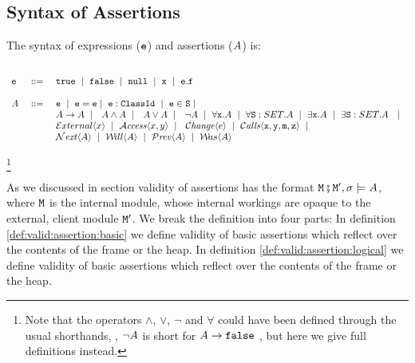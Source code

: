 \subsection{Syntax of Assertions}

\begin{definition}[Assertions] The syntax of   expressions (${\mbox{\tt{e}}}$) and assertions ($A$) is:
\label{def:assertions}

 $\begin{array}{lcl}
  ~  \\
  \SE & ::= &  \prg{true}  \ \mid\ \prg{false}  \    \mid\ \prg{null}  \ \mid \ \x  \ \mid \ \SE.\f  \\  
 ~ \\
\A &\ ::=\  &   \SE \   \mid \  \SE=\SE  \mid \   \SE:\prg{ClassId}  \ \mid \
    \SE\in\prg{S}   \mid  \  \\
    & &  \A \rightarrow \A  \ \mid\  \     \A \wedge \A  \ \mid\  \ \A \vee \A  \ \mid\  \ \neg A   \ \mid \  \forall \x.\A  \ \mid \  \forall \prg{S}:SET.\A  \ \mid  \  \exists \x.\A  \ \mid \  \exists \prg{S}:SET.\A  \  \ \mid\   \\
 &    & \External x   \ \mid\   \CanAccess x y \ \mid\  \ \Changes e \ \mid\  \Calls{\prg{x},\prg{y},\prg{m},\prg{z}} \ \mid\  \\  
 &    &  \Next \A  \ \mid \   \Future \A \ \mid \  \Prev \A    \ \mid \  \Past \A \ 
\end{array}$
\end{definition}
\footnote{
Note that the operators $\wedge$, $\vee$,  $\neg$ and $\forall$  could have been defined  through the usual shorthands, \eg, $\neg A$ is short for
$A \rightarrow {\mbox{\tt{false}}}$ \etc, but here we give full definitions instead.}


As we discussed in section  validity of assertions has the format ${\mbox{\tt{\ensuremath{{\mbox{\tt{M}}}}}}}\fatsemi {\mbox{\tt{\ensuremath{{\mbox{\tt{M}}}}}}}', \sigma \models A$, where  ${\mbox{\tt{\ensuremath{{\mbox{\tt{M}}}}}}}$ is the internal module, whose internal workings
 are opaque to the external, client module ${\mbox{\tt{\ensuremath{{\mbox{\tt{M}}}}}}}'$.
 We break the definition into four parts: In definition  \ref{def:valid:assertion:basic} we define validity 
 of basic assertions which reflect over the contents of the frame or the heap. 
 In  definition  \ref{def:valid:assertion:logical} we define validity 
 of basic assertions which reflect over the contents of the frame or the heap. 

